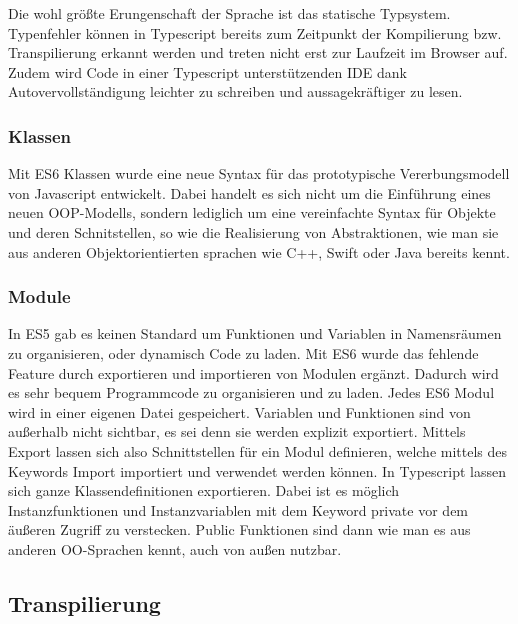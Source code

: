 Die wohl größte Erungenschaft der Sprache ist das statische Typsystem.
Typenfehler können in Typescript bereits zum Zeitpunkt
der Kompilierung bzw. Transpilierung erkannt werden und treten nicht erst zur Laufzeit im Browser auf.
Zudem wird Code in einer Typescript unterstützenden IDE dank Autovervollständigung
leichter zu schreiben und aussagekräftiger zu lesen.\cite[156]{ng-Book-2}

\subsubsection{Klassen}

Mit ES6 Klassen wurde eine neue Syntax für das prototypische Vererbungsmodell von Javascript entwickelt.
Dabei handelt es sich nicht um die Einführung eines neuen OOP-Modells, sondern lediglich um eine vereinfachte Syntax für Objekte und deren Schnitstellen,
so wie die Realisierung von Abstraktionen, wie man sie aus anderen Objektorientierten sprachen wie C++, Swift oder Java bereits kennt.\cite{js-Klassen}



\subsubsection{Module}

In ES5 gab es keinen Standard um Funktionen und Variablen in Namensräumen zu organisieren, oder dynamisch Code zu laden.
Mit ES6 wurde das fehlende Feature durch exportieren und importieren von Modulen ergänzt. Dadurch wird es sehr bequem Programmcode zu organisieren und zu laden.
Jedes ES6 Modul wird in einer eigenen Datei gespeichert. Variablen und Funktionen sind von außerhalb nicht sichtbar, es sei denn sie werden explizit exportiert.
Mittels Export lassen sich also Schnittstellen für ein Modul definieren, welche mittels des Keywords Import importiert und verwendet werden können.
In Typescript lassen sich ganze Klassendefinitionen exportieren.
Dabei ist es möglich Instanzfunktionen und Instanzvariablen mit dem Keyword private vor dem äußeren Zugriff zu verstecken.
Public Funktionen sind dann wie man es aus anderen OO-Sprachen kennt, auch von außen nutzbar.



\subsection{Transpilierung}

